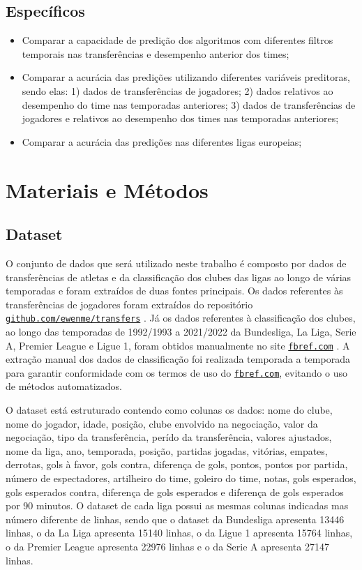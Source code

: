 \documentclass[a4paper]{article}
\theoremstyle{plain}
\theoremstyle{definition}
\begin{document}
\subsection{Específicos}
\begin{itemize}
    \item Comparar a capacidade de predição dos algoritmos com diferentes filtros temporais nas transferências e desempenho anterior dos times;
    \item Comparar a acurácia das predições utilizando diferentes variáveis preditoras, sendo elas: 1) dados de transferências de jogadores; 2) dados relativos ao desempenho do time nas temporadas anteriores; 3) dados de transferências de jogadores e relativos ao desempenho dos times nas temporadas anteriores;
    \item Comparar a acurácia das predições nas diferentes ligas europeias;
\end{itemize}

\section{Materiais e Métodos}

\subsection{Dataset}
O conjunto de dados que será utilizado neste trabalho é composto por dados de transferências de atletas e da classificação dos clubes das ligas ao longo de várias temporadas e foram extraídos de duas fontes principais. Os dados referentes às transferências de jogadores foram extraídos do repositório 
\href{https://github.com/ewenme/transfers}{\texttt{github.com/ewenme/transfers}} \cite{ewenme_transfers}.
Já os dados referentes à classificação dos clubes, ao longo das temporadas de 1992/1993 a 2021/2022 da Bundesliga, La Liga, Serie A, Premier League e Ligue 1, foram obtidos manualmente no site 
\href{https://fbref.com}{\texttt{fbref.com}} \cite{fbref}. A extração manual dos dados de classificação foi realizada temporada a temporada para garantir conformidade com os termos de uso do \href{https://fbref.com}{\texttt{fbref.com}}, evitando o uso de métodos automatizados.

O dataset está estruturado contendo como colunas os dados: nome do clube, nome do jogador, idade, posição, clube envolvido na negociação, valor da negociação, tipo da transferência, perído da transferência, valores ajustados, nome da liga, ano, temporada, posição, partidas jogadas, vitórias, empates, derrotas, gols à favor, gols contra, diferença de gols, pontos, pontos por partida, número de espectadores, artilheiro do time, goleiro do time, notas, gols esperados, gols esperados contra, diferença de gols esperados e diferença de gols esperados por 90 minutos. O dataset de cada liga possui as mesmas colunas indicadas mas número diferente de linhas, sendo que o dataset da Bundesliga apresenta 13446 linhas, o da La Liga apresenta 15140 linhas, o da Ligue 1 apresenta 15764 linhas, o da Premier League apresenta 22976 linhas e o da Serie A apresenta 27147 linhas.
\end{document}
